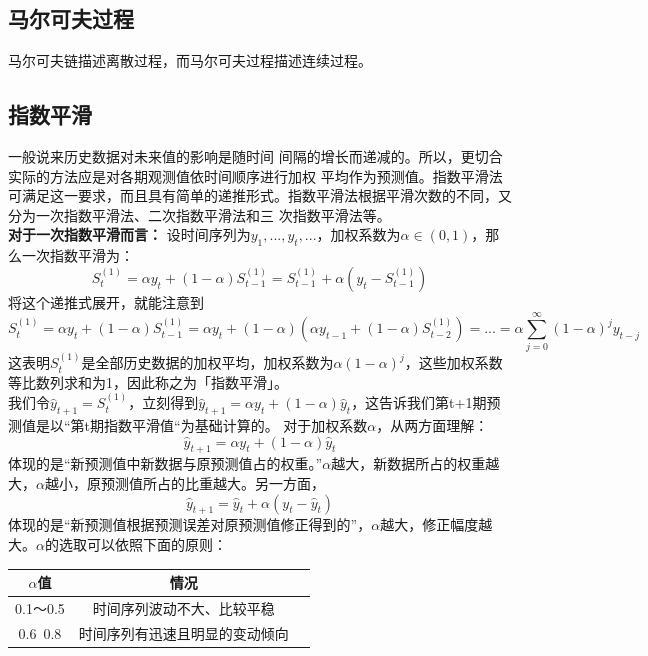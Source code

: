 \documentclass[11pt,a4paper]{article}
\begin{document}
\subsection{马尔可夫过程}
马尔可夫链描述离散过程，而马尔可夫过程描述连续过程。
\subsection{指数平滑}
一般说来历史数据对未来值的影响是随时间 间隔的增长而递减的。所以，更切合实际的方法应是对各期观测值依时间顺序进行加权 平均作为预测值。指数平滑法可满足这一要求，而且具有简单的递推形式。指数平滑法根据平滑次数的不同，又分为一次指数平滑法、二次指数平滑法和三 次指数平滑法等。\\
\indent\setlength{\parindent}{2em}\textbf{对于一次指数平滑而言：}
设时间序列为$y_1,...,y_t,...$，加权系数为$\alpha \in (0,1)$，那么一次指数平滑为：
\begin{equation*}
	S_t^{(1)}=\alpha y_t+(1-\alpha)S_{t-1}^{(1)}=S_{t-1}^{(1)}+\alpha(y_t-S_{t-1}^{(1)})
\end{equation*}
将这个递推式展开，就能注意到
\begin{equation*}
S_t^{(1)}=\alpha y_t+(1-\alpha)S_{t-1}^{(1)}=\alpha y_t+(1-\alpha)(\alpha y_{t-1}+(1-\alpha)S_{t-2}^{(1)})=...=\alpha \sum_{j=0}^{\infty}(1-\alpha)^j y_{t-j}
\end{equation*}
这表明$S_t^{(1)}$是全部历史数据的加权平均，加权系数为$\alpha(1-\alpha)^j$，这些加权系数等比数列求和为1，因此称之为「指数平滑」。\\
我们令$\hat y_{t+1}=S_t^{(1)}$，立刻得到$\hat y_{t+1}=\alpha y_t+(1-\alpha)\hat y_{t}$，这告诉我们第t+1期预测值是以“第t期指数平滑值“为基础计算的。
对于加权系数$\alpha$，从两方面理解：
\begin{equation*}
\hat y_{t+1}=\alpha y_t+(1-\alpha)\hat y_{t}
\end{equation*}
体现的是“新预测值中新数据与原预测值占的权重。”$\alpha$越大，新数据所占的权重越大，$\alpha$越小，原预测值所占的比重越大。另一方面，
\begin{equation*}
	\hat y_{t+1}=\hat y_{t}+\alpha(y_t-\hat y_t)
\end{equation*}
体现的是“新预测值根据预测误差对原预测值修正得到的”，$\alpha$越大，修正幅度越大。$\alpha$的选取可以依照下面的原则：\\
\begin{table}[h]
	\centering
	\begin{tabular}{ccc}
		\hline
		$\alpha$值& 情况 \\
		\hline
		0.1～0.5 & 时间序列波动不大、比较平稳\\
		0.6~0.8 & 时间序列有迅速且明显的变动倾向\\
		\hline
	\end{tabular}
\end{table}
\end{document}
